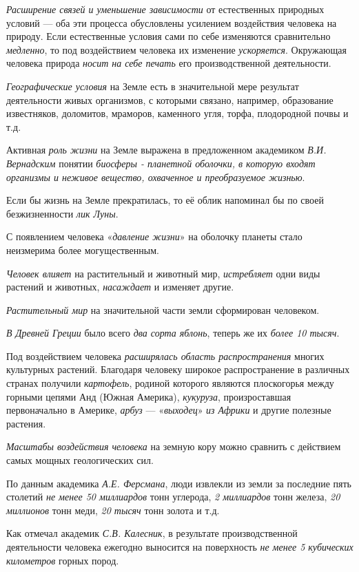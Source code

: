 \documentclass[a4paper,14pt,russian]{extreport}
\begin{document}
\emph{Расширение связей и уменьшение зависимости} от естественных природных условий --- оба эти процесса обусловлены усилением воздействия человека на природу. Если естественные условия сами по себе изменяются сравнительно \emph{медленно}, то под воздействием человека их изменение \emph{ускоряется}. Окружающая человека природа \emph{носит на себе печать} его производственной деятельности.

\emph{Географические условия} на Земле есть в значительной мере результат деятельности живых организмов, с которыми связано, например, образование известняков, доломитов, мраморов, каменного угля, торфа, плодородной почвы и т.д.

Активная \emph{роль жизни} на Земле выражена в предложенном академиком \emph{В.И. Вернадским} понятии \emph{биосферы - планетной оболочки, в которую входят организмы и неживое вещество, охваченное и преобразуемое жизнью}.

Если бы жизнь на Земле прекратилась, то её облик напоминал бы по своей безжизненности \emph{лик Луны}.

С появлением человека «\emph{давление жизни}» на оболочку планеты стало неизмерима более могущественным.

\emph{Человек влияет} на растительный и животный мир, \emph{истребляет} одни виды растений и животных, \emph{насаждает} и изменяет другие.

\emph{Растительный мир} на значительной части земли сформирован человеком.

\emph{В Древней Греции} было всего \emph{два сорта яблонь}, теперь же их \emph{более 10 тысяч}.

Под воздействием человека \emph{расширялась область распространения} многих культурных растений. Благодаря человеку широкое распространение в различных странах получили \emph{картофель}, родиной которого являются плоскогорья между горными цепями Анд (Южная Америка), \emph{кукуруза}, произроставшая первоначально в Америке, \emph{арбуз} --- «\emph{выходец}» \emph{из Африки} и другие полезные растения.

\emph{Масштабы воздействия человека} на земную кору можно сравнить с действием самых мощных геологических сил.

По данным академика \emph{А.Е. Ферсмана}, люди извлекли из земли за последние пять столетий \emph{не менее 50 миллиардов} тонн углерода, \emph{2 миллиардов} тонн железа, \emph{20 миллионов} тонн меди, \emph{20 тысяч} тонн золота и т.д.

Как отмечал академик \emph{С.В. Калесник}, в результате производственной деятельности человека ежегодно выносится на поверхность \emph{не менее 5 кубических километров} горных пород.
\end{document}
